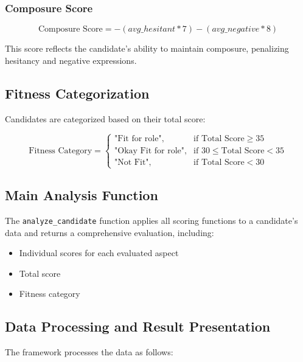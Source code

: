 \documentclass{article}
\begin{document}
\subsubsection{Composure Score}
\begin{equation}
    \text{Composure Score} = -(avg\_hesitant * 7) - (avg\_negative * 8)
\end{equation}

This score reflects the candidate's ability to maintain composure, penalizing hesitancy and negative expressions.

\subsection{Fitness Categorization}

Candidates are categorized based on their total score:

\begin{equation}
    \text{Fitness Category} = \begin{cases}
        \text{"Fit for role"}, & \text{if Total Score} \geq 35 \\
        \text{"Okay Fit for role"}, & \text{if } 30 \leq \text{Total Score} < 35 \\
        \text{"Not Fit"}, & \text{if Total Score} < 30
    \end{cases}
\end{equation}

\subsection{Main Analysis Function}

The \texttt{analyze\_candidate} function applies all scoring functions to a candidate's data and returns a comprehensive evaluation, including:

\begin{itemize}
    \item Individual scores for each evaluated aspect
    \item Total score
    \item Fitness category
\end{itemize}

\subsection{Data Processing and Result Presentation}

The framework processes the data as follows:
\end{document}
